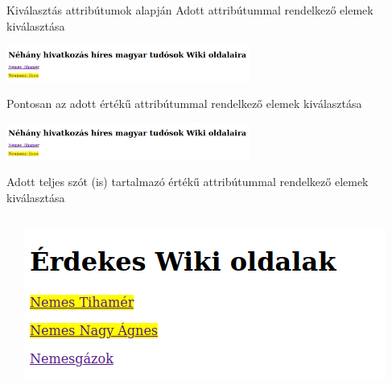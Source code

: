 \begin{frame}
  Kiválasztás attribútumok alapján
  \vfill
  Adott attribútummal rendelkező elemek kiválasztása
  \begin{exampleblock}{}
    \fontsize{7}{8} \selectfont
    
    
  \end{exampleblock}
  \begin{center}
    \includegraphics[width=0.6\textwidth]{attributum1.png}
  \end{center}
\end{frame}

\begin{frame}
  Pontosan az adott értékű attribútummal rendelkező elemek kiválasztása
  \begin{exampleblock}{}
    \fontsize{7}{8} \selectfont
    
    
  \end{exampleblock}
  \begin{center}
    \includegraphics[width=0.6\textwidth]{attributum2.png}
  \end{center}
\end{frame}

\begin{frame}
  Adott teljes szót (is) tartalmazó értékű attribútummal rendelkező elemek kiválasztása
  \begin{columns}[c]
      \begin{exampleblock}{}
      \scriptsize
      
      
  \end{exampleblock}
      \includegraphics[width=\textwidth]{attributum3.png}
  \end{columns}
\end{frame}

